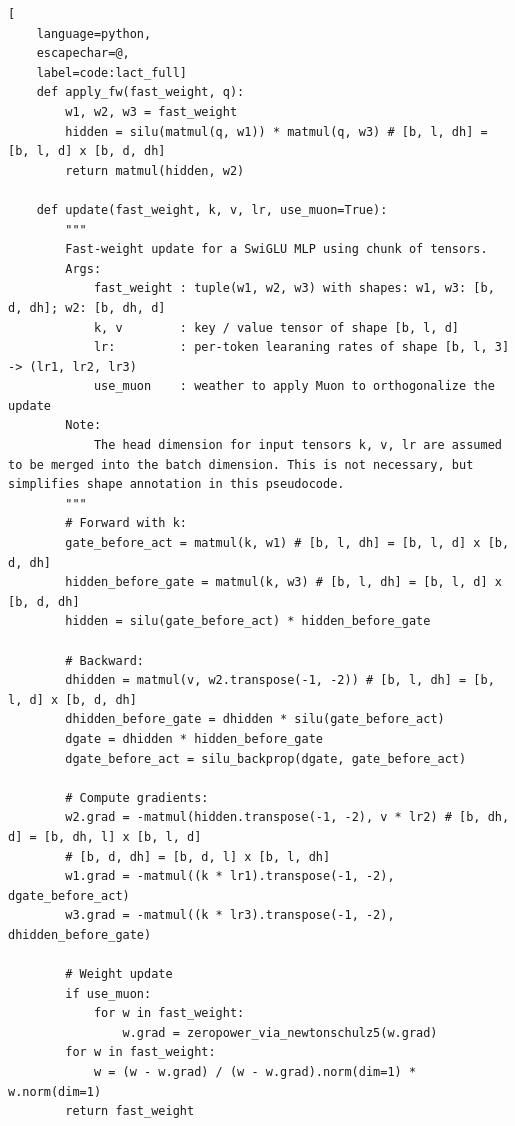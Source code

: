 \begin{algorithm}[p]
\caption{Large Chunk Test-Time Training Layer Pseudocode}\label{alg:full_lact_layer}
\newcommand{\hlbox}[1]{%
  \fboxsep=1.2pt\hspace*{-\fboxsep}\colorbox{blue!10}{\detokenize{#1}}%
}
\lstset{style=mocov3}
\begin{lstlisting}[
    language=python,
    escapechar=@,
    label=code:lact_full]
    def apply_fw(fast_weight, q):
        w1, w2, w3 = fast_weight
        hidden = silu(matmul(q, w1)) * matmul(q, w3) # [b, l, dh] = [b, l, d] x [b, d, dh]
        return matmul(hidden, w2)
        
    def update(fast_weight, k, v, lr, use_muon=True):
        """
        Fast-weight update for a SwiGLU MLP using chunk of tensors. 
        Args:
            fast_weight : tuple(w1, w2, w3) with shapes: w1, w3: [b, d, dh]; w2: [b, dh, d]
            k, v        : key / value tensor of shape [b, l, d]
            lr:         : per-token learaning rates of shape [b, l, 3] -> (lr1, lr2, lr3)
            use_muon    : weather to apply Muon to orthogonalize the update
        Note:
            The head dimension for input tensors k, v, lr are assumed to be merged into the batch dimension. This is not necessary, but simplifies shape annotation in this pseudocode.
        """
        # Forward with k:
        gate_before_act = matmul(k, w1) # [b, l, dh] = [b, l, d] x [b, d, dh]
        hidden_before_gate = matmul(k, w3) # [b, l, dh] = [b, l, d] x [b, d, dh]
        hidden = silu(gate_before_act) * hidden_before_gate
        
        # Backward:
        dhidden = matmul(v, w2.transpose(-1, -2)) # [b, l, dh] = [b, l, d] x [b, d, dh]
        dhidden_before_gate = dhidden * silu(gate_before_act)
        dgate = dhidden * hidden_before_gate
        dgate_before_act = silu_backprop(dgate, gate_before_act)

        # Compute gradients: 
        w2.grad = -matmul(hidden.transpose(-1, -2), v * lr2) # [b, dh, d] = [b, dh, l] x [b, l, d]
        # [b, d, dh] = [b, d, l] x [b, l, dh]
        w1.grad = -matmul((k * lr1).transpose(-1, -2), dgate_before_act)
        w3.grad = -matmul((k * lr3).transpose(-1, -2), dhidden_before_gate)

        # Weight update
        if use_muon:
            for w in fast_weight:
                w.grad = zeropower_via_newtonschulz5(w.grad)
        for w in fast_weight:
            w = (w - w.grad) / (w - w.grad).norm(dim=1) * w.norm(dim=1)
        return fast_weight


\end{lstlisting}
\end{algorithm}
